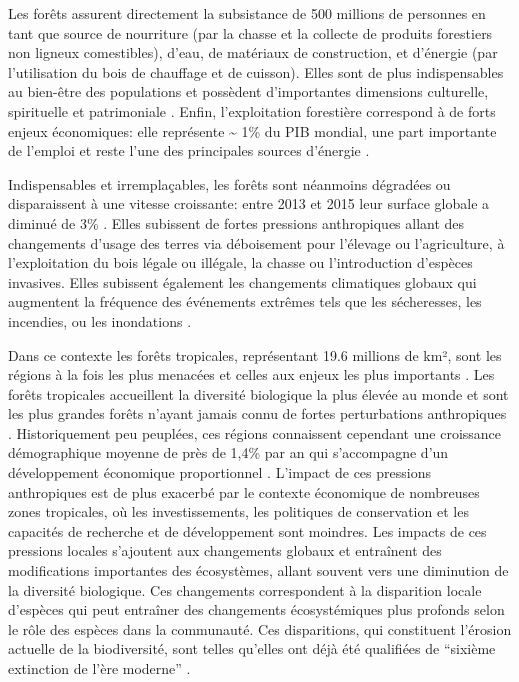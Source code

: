 \documentclass[
  11pt,
  french,
  A4paper,
  extrafontsizes,onecolumn,openright
  ]{memoir}
\begin{document}
Les forêts assurent directement la subsistance de 500 millions de
personnes en tant que source de nourriture (par la chasse et la collecte
de produits forestiers non ligneux comestibles), d'eau, de matériaux de
construction, et d'énergie (par l'utilisation du bois de chauffage et de
cuisson). Elles sont de plus indispensables au bien-être des populations
et possèdent d'importantes dimensions culturelle, spirituelle et
patrimoniale \autocites{FRA2015}{Tilman2014}. Enfin, l'exploitation
forestière correspond à de forts enjeux économiques: elle représente
\textasciitilde{} 1\% du PIB mondial, une part importante de l'emploi et
reste l'une des principales sources d'énergie
\autocites{CBDdiversity2011}{FAO2014}.

Indispensables et irremplaçables, les forêts sont néanmoins dégradées ou
disparaissent à une vitesse croissante: entre 2013 et 2015 leur surface
globale a diminué de 3\% \autocite{FAO2009}. Elles subissent de fortes
pressions anthropiques allant des changements d'usage des terres via
déboisement pour l'élevage ou l'agriculture, à l'exploitation du bois
légale ou illégale, la chasse ou l'introduction d'espèces invasives.
Elles subissent également les changements climatiques globaux qui
augmentent la fréquence des événements extrêmes tels que les
sécheresses, les incendies, ou les inondations
\autocite{Pachauri2014}.\newline

Dans ce contexte les forêts tropicales, représentant 19.6 millions de
km², sont les régions à la fois les plus menacées et celles aux enjeux
les plus importants \autocite{Barlow2018}. Les forêts tropicales
accueillent la diversité biologique la plus élevée au monde et sont les
plus grandes forêts n'ayant jamais connu de fortes perturbations
anthropiques \autocites{Gentry1988}{FAO2011}. Historiquement peu
peuplées, ces régions connaissent cependant une croissance démographique
moyenne de près de 1,4\% par an qui s'accompagne d'un développement
économique proportionnel \autocite{Asner2009}. L'impact de ces pressions
anthropiques est de plus exacerbé par le contexte économique de
nombreuses zones tropicales, où les investissements, les politiques de
conservation et les capacités de recherche et de développement sont
moindres. Les impacts de ces pressions locales s'ajoutent aux
changements globaux et entraînent des modifications importantes des
écosystèmes, allant souvent vers une diminution de la diversité
biologique. Ces changements correspondent à la disparition locale
d'espèces qui peut entraîner des changements écosystémiques plus
profonds selon le rôle des espèces dans la communauté. Ces disparitions,
qui constituent l'érosion actuelle de la biodiversité, sont telles
qu'elles ont déjà été qualifiées de ``sixième extinction de l'ère
moderne'' \autocites{Vitousek1997}{Cardinale2012}.
\end{document}
